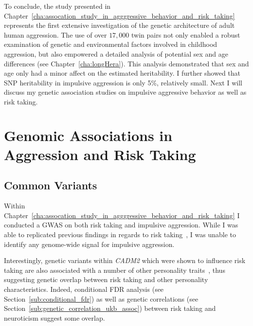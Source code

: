 To conclude, the study presented in Chapter~\ref{cha:assocation_study_in_agggressive_behavior_and_risk_taking} represents the first extensive investigation of the genetic architecture of adult human aggression.
The use of over $17,000$ twin pairs not only enabled a robust examination of genetic and environmental factors involved in childhood aggression, but also empowered a detailed analysis of potential sex and age differences (see Chapter~\ref{cha:longHera}).
This analysis demonstrated that sex and age only had a minor affect on the estimated heritability.
I further showed that SNP heritability in impulsive aggression is  only 5\%, relatively small.
Next I will discuss my genetic association studies on impulsive aggressive behavior as well as risk taking. 

\section{Genomic Associations in Aggression and Risk Taking}
\label{sec:genomic_associations_in_aggression_and_risk_taking}

\subsection{Common Variants}
\label{sub:common_variants_discussion}

Within Chapter~\ref{cha:assocation_study_in_agggressive_behavior_and_risk_taking} I conducted a GWAS on both risk taking and impulsive aggression.
While I was able to replicated previous findings in regards to risk taking~\cite{Day2016}, I was unable to identify any genome-wide signal for impulsive aggression.

Interestingly, genetic variants within \textit{CADM2} which were shown to influence risk taking are also associated with a number of other personality traits~\cite{Boutwell2017},
thus suggesting genetic overlap between risk taking and other personality characteristics.
Indeed, conditional FDR analysis (see Section~\ref{sub:conditional_fdr}) as well as genetic correlations (see Section~\ref{sub:genetic_correlation_ukb_assoc}) between risk taking and neuroticism suggest some overlap.

